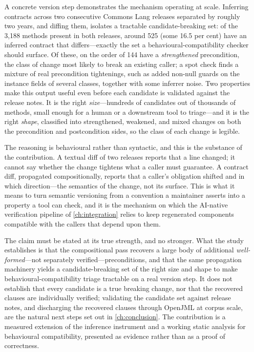 A concrete version step demonstrates the mechanism operating at scale. Inferring
contracts across two consecutive Commons Lang releases separated by roughly two
years, and diffing them, isolates a tractable candidate-breaking set: of the
3{,}188 methods present in both releases, around 525 (some 16.5 per cent) have an
inferred contract that differs---exactly the set a behavioural-compatibility
checker should surface. Of these, on the order of 144 have a \emph{strengthened}
precondition, the class of change most likely to break an existing caller; a spot
check finds a mixture of real precondition tightenings, such as added non-null
guards on the instance fields of several classes, together with some inferrer
noise. Two properties make this output useful even before each candidate is
validated against the release notes. It is the right \emph{size}---hundreds of
candidates out of thousands of methods, small enough for a human or a
downstream tool to triage---and it is the right \emph{shape}, classified into
strengthened, weakened, and mixed changes on both the precondition and
postcondition sides, so the class of each change is legible.

The reasoning is behavioural rather than syntactic, and this is the substance of
the contribution. A textual diff of two releases reports that a line changed; it
cannot say whether the change tightens what a caller must guarantee. A contract
diff, propagated compositionally, reports that a caller's obligation shifted and
in which direction---the semantics of the change, not its surface. This is what
it means to turn semantic versioning from a convention a maintainer asserts into
a property a tool can check, and it is the mechanism on which the AI-native
verification pipeline of \cref{ch:integration} relies to keep regenerated
components compatible with the callers that depend upon them.

The claim must be stated at its true strength, and no stronger. What the study
establishes is that the compositional pass recovers a large body of additional
\emph{well-formed}---not separately verified---preconditions, and that the same
propagation machinery yields a candidate-breaking set of the right size and shape
to make behavioural-compatibility triage tractable on a real version step. It
does not establish that every candidate is a true breaking change, nor that the
recovered clauses are individually verified; validating the candidate set against
release notes, and discharging the recovered clauses through OpenJML at corpus
scale, are the natural next steps set out in \cref{ch:conclusion}. The
contribution is a measured extension of the inference instrument and a working
static analysis for behavioural compatibility, presented as evidence rather than
as a proof of correctness.

